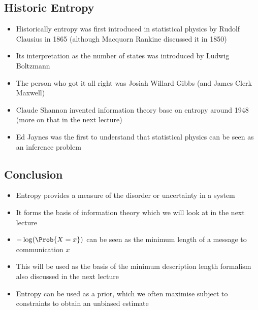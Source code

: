 
\begin{slide}
\section[-1]{Historic Entropy}

\begin{PauseHighLight}
  \begin{itemize}
  \item Historically entropy was first introduced in statistical
    physics by Rudolf Clausius in 1865 (although Macquorn Rankine
    discussed it in 1850)\pause
  \item Its interpretation as the number of states was introduced by
    Ludwig Boltzmann\pause
  \item The person who got it all right was Josiah Willard Gibbs (and
    James Clerk Maxwell)\pause
  \item Claude Shannon invented information theory base on entropy
    around 1948 (more on that in the next lecture)\pause
  \item Ed Jaynes was the first to understand that statistical physics
    can be seen as an inference problem\pause
  \end{itemize}
\end{PauseHighLight}

\end{slide}


\begin{slide}
\section{Conclusion}

\begin{PauseHighLight}
  \begin{itemize}
  \item Entropy provides a measure of the disorder or uncertainty in a
    system\pause
  \item It forms the basis of information theory which we will look at
    in the next lecture\pause
  \item $-\log(\Prob{X=x})$ can be seen as the minimum length of a
    message to communication $x$\pause
  \item This will be used as the basis of the minimum description
    length formalism also discussed in the next lecture\pause
  \item Entropy can be used as a prior, which we often maximise
    subject to constraints to obtain an unbiased estimate\pause
  \end{itemize}
\end{PauseHighLight}

\end{slide}





